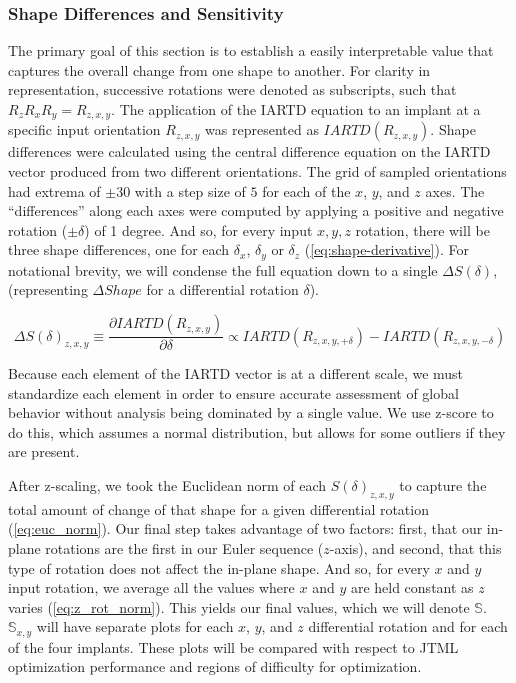 \subsubsection{Shape Differences and Sensitivity}
The primary goal of this section is to establish a easily interpretable value that captures the overall change from one shape to another.
For clarity in representation, successive rotations were denoted as subscripts, such that $R_{z}R_{x}R_{y} = R_{z,x,y}$. The application of the IARTD equation to an implant at a specific input orientation $R_{z,x,y}$ was represented as $IARTD(R_{z,x,y})$.
Shape differences were calculated using the central difference equation on the IARTD vector produced from two different orientations.
The grid of sampled orientations had extrema of $\pm 30$ with a step size of $5$ for each of the $x$, $y$, and $z$ axes.
The ``differences'' along each axes were computed by applying a positive and negative rotation ($\pm \delta $) of 1 degree.
And so, for every input $x,y,z$ rotation, there will be three shape differences, one for each $\delta_{x}$, $\delta_{y}$ or $\delta_{z}$ (\cref{eq:shape-derivative}).
For notational brevity, we will condense the full equation down to a single $\Delta S(\delta)$, (representing $\Delta Shape$ for a differential rotation $\delta$).

\begin{equation}
	\label{eq:shape-derivative}
	\Delta S(\delta)_{z,x,y} \equiv \dfrac{ \partial IARTD(R_{z,x,y}) }{\partial \delta} \propto IARTD(R_{z,x,y,+\delta}) - IARTD(R_{z,x,y,-\delta})
\end{equation}

Because each element of the IARTD vector is at a different scale, we must standardize each element in order to ensure accurate assessment of global behavior without analysis being dominated by a single value.
We use z-score to do this, which assumes a normal distribution, but allows for some outliers if they are present.


After z-scaling, we took the Euclidean norm of each $S(\delta)_{z,x,y}$ to capture the total amount of change of that shape for a given differential rotation (\cref{eq:euc_norm}).
Our final step takes advantage of two factors: first, that our in-plane rotations are the first in our Euler sequence ($z$-axis), and second, that this type of rotation does not affect the in-plane shape.
And so, for every $x$ and $y$ input rotation, we average all the values where $x$ and $y$ are held constant as $z$ varies (\cref{eq:z_rot_norm}).
This yields our final values, which we will denote $\mathbb{S}$.
$\mathbb{S}_{x,y}$ will have separate plots for each $x$, $y$, and $z$ differential rotation and for each of the four implants.
These plots will be compared with respect to JTML optimization performance and regions of difficulty for optimization.


